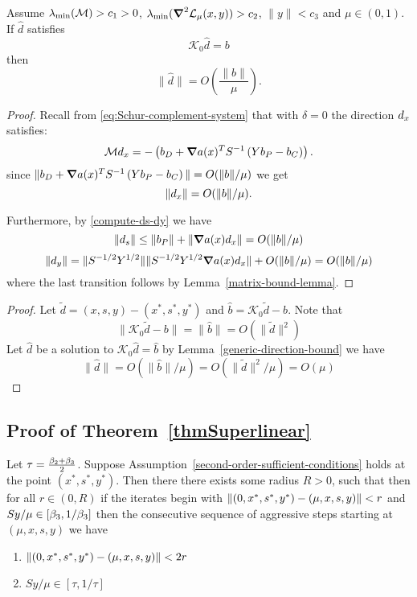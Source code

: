 \documentclass{article}
\begin{document}
\begin{lemma}\label{generic-direction-bound}
Assume $\lambda_{\min}(\mathcal{M}) > c_{1} > 0$, $\lambda_{\min}( \grad^2 \mathcal{L}_{\mu}(x,y) ) > c_{2}$, $\| y \| < c_{3}$ and $\mu \in (0,1)$. If $\hat{d}$ satisfies
$$\mathcal{K}_{0} \hat{d} = b$$
then
$$
\| \hat{d} \| = O \left( \frac{\| b \|}{\mu} \right).
$$
\end{lemma}

\begin{proof}
Recall from \eqref{eq:Schur-complement-system} that with $\delta = 0$ the direction $d_{x}$ satisfies:
$$
\mathcal{M} d_{x} = -\left( b_{D} + \grad a(x)^T S^{-1} \left( Y b_{P} - b_{C} \right) \right).
$$
since $\| b_{D} + \grad a(x)^T S^{-1} \left( Y b_{P} - b_{C} \right) \| = O( \| b \| / \mu)$ we get
$$
\| d_{x} \| = O( \| b \| / \mu).
$$

Furthermore, by \eqref{compute-ds-dy} we have
$$
\| d_{s} \| \le \| b_{P} \| + \| \grad a(x) d_{x} \| = O( \| b \| / \mu )
$$
$$
\| d_{y} \| = \| S^{-1/2} Y^{1/2} \| \| S^{-1/2} Y^{1/2} \grad a(x) d_{x} \| + O(  \| b \| / \mu) = O(  \| b \| / \mu)
$$
where the last transition follows by Lemma~\ref{matrix-bound-lemma}.
\end{proof}



\lemDistanceToDirection*

\begin{proof}
Let $\tilde{d} = (x,s,y) - (x^{*}, s^{*}, y^{*})$ and $\hat{b} = \mathcal{K}_{0} \tilde{d} - b$. Note that
$$
\| \mathcal{K}_{0} \tilde{d} - b \| = \| \hat{b} \| = O( \| \tilde{d} \|^2 )
$$
Let $\hat{d}$ be a solution to $\mathcal{K}_{0} \hat{d} = \hat{b}$ by Lemma~\ref{generic-direction-bound} we have
$$
\| \hat{d} \| = O ( \| \hat{b} \| / \mu ) = O( \| \tilde{d} \|^2 / \mu ) = O(\mu)
$$
\end{proof}


\subsection{Proof of Theorem~\ref{thmSuperlinear}}\label{sec:thmSuperlinear}
\begin{lemma}
Let $\tau = \frac{\beta_{2} + \beta_{3}}{2}$.
Suppose Assumption~\ref{second-order-sufficient-conditions} holds at the point $(x^{*}, s^{*}, y^{*})$. Then there there exists some radius $R > 0$, such that then for all $r \in (0,R)$  if the iterates begin with $\norm{ (0,x^{*},s^{*},y^{*}) - (\mu,x,s,y) } < r$ and $Sy / \mu \in [\beta_{3}, 1/\beta_{3}]$ then the consecutive sequence of aggressive steps starting at $(\mu,x,s,y)$ we have
\begin{enumerate}
\item $\norm{ (0,x^{*},s^{*},y^{*}) - (\mu, x,s,y) } < 2 r$
\item $Sy / \mu \in [\tau, 1/\tau]$
\end{enumerate}
\end{lemma}
\end{document}
